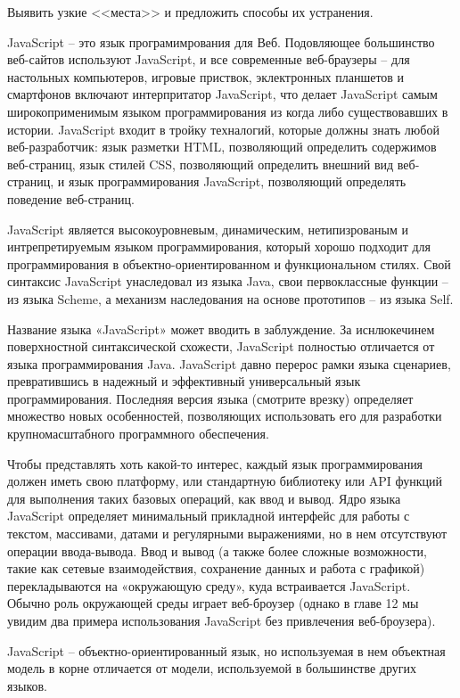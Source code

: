 Выявить узкие <<места>> и предложить способы их устранения.



JavaScript -- это язык програмимрования для Веб. Подовляющее большинство веб-сайтов используют JavaScript, и все современные веб-браузеры -- для настольных компьютеров, игровые приствок, эклектронных планшетов и смартфонов включают интерпритатор JavaScript, что делает JavaScript самым широкоприменимым языком программирования из когда либо существовавших в истории. JavaScript входит в тройку техналогий, которые должны знать  любой веб-разработчик: язык разметки HTML, позволяющий определить содержимов веб-страниц, язык стилей CSS, позволяющий определить внешний вид веб-страниц, и язык программирования JavaScript, позволяющий определять поведение веб-страниц.

JavaScript является высокоуровневым, динамическим, нетипизрованым и интрепретируемым языком программирования, который хорошо подходит для программирования в объектно-ориентированном и функциональном стилях. Свой синтаксис JavaScript унаследовал из языка Java, свои первоклассные функции – из языка Scheme, а механизм наследования на основе прототипов – из языка Self. 

Название языка «JavaScript» может вводить в заблуждение. За иснлюкечинем поверхностной синтаксической схожести, JavaScript полностью отличается от языка программирования Java. JavaScript давно перерос рамки языка сценариев, превратившись в надежный и эффективный универсальный язык программирования. Последняя версия языка (смотрите врезку) определяет множество новых особенностей, позволяющих использовать его для разработки крупномасштабного программного обеспечения.


Чтобы представлять хоть какой-то интерес, каждый язык программирования должен иметь свою платформу, или стандартную библиотеку или API функций для выполнения таких базовых операций, как ввод и  вывод. Ядро языка JavaScript определяет минимальный прикладной интерфейс для работы с текстом, массивами, датами и регулярными выражениями, но в нем отсутствуют операции ввода-вывода. Ввод и вывод (а также более сложные возможности, такие как сетевые взаимодействия, сохранение данных и работа с графикой) перекладываются на «окружающую среду», куда встраивается JavaScript. Обычно роль окружающей среды играет веб-броузер (однако в главе 12 мы увидим два примера использования JavaScript без привлечения веб-броузера).

JavaScript – объектно-ориентированный язык, но используемая в нем объектная модель в корне отличается от модели, используемой в большинстве других языков. 


